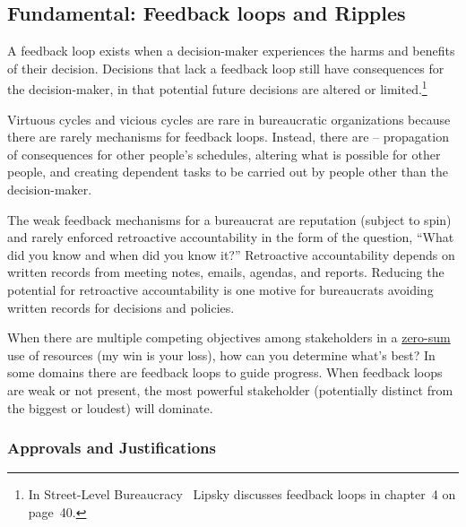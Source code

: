 \subsection*{Fundamental: Feedback loops and Ripples\label{sec:feedback-loop-and-ripples}}



A feedback loop exists when a decision-maker experiences the harms and benefits of their decision. Decisions that lack a feedback loop still have consequences for the decision-maker, in that potential future decisions are altered or limited.\footnote{In Street-Level Bureaucracy~\cite{1983_Lipsky} Lipsky discusses feedback loops in chapter~4 on page~40.}


Virtuous cycles and vicious cycles are rare in bureaucratic organizations because there are rarely mechanisms for feedback loops. 
Instead, there are \iftoggle{glossarysubstitutionworks}{\glspl{ripple}}{ripples} -- propagation of consequences for other people's schedules, 
altering what is possible for other people, and creating dependent tasks to be carried out by people other than the decision-maker.


The weak feedback mechanisms for a bureaucrat are reputation (subject to spin)
and rarely enforced retroactive accountability in the form of the question, ``What did you know and when did you know it?''
Retroactive accountability depends on written records from meeting notes, emails, agendas, and reports. Reducing the potential for retroactive accountability is one motive for bureaucrats avoiding written records for decisions and policies.

When there are multiple competing objectives among stakeholders in a 
\href{https://en.wikipedia.org/wiki/Zero-sum_game}{zero-sum}
\iftoggle{WPinmargin}{\marginpar{$>$Wikipedia: zero-sum game}}{ }%
use of resources (my win is your loss), how can you determine what's best? In some domains there are feedback loops to guide progress. When feedback loops are weak or not present,  the most powerful stakeholder (potentially distinct from the biggest or loudest) will dominate. 

\subsubsection*{Approvals and Justifications}

